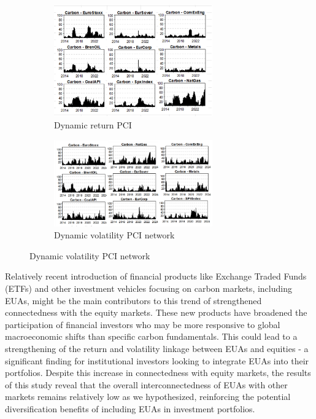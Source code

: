 \documentclass[preprint, 3p,
authoryear]{elsarticle} %
\begin{document}
\begin{figure}[H]
  \caption{Dynamic Return and Volatility Pairwise Connectedness Index (PCI) (Jan 2013 – Aug 2024)}
  \label{fig:dynPCI}
      \begin{subfigure}[b]{\textwidth}
        \centering
        \caption{Dynamic return PCI}
        \label{fig:dynretPCI}
        \includegraphics[width = 0.75\textwidth]{5a-DynRetPCI}
      \end{subfigure}
      \begin{subfigure}[b]{\textwidth}
        \centering
        \bigskip
        \caption{Dynamic volatility PCI network}
        \label{fig:dynvolPCI}
        \includegraphics[width = 0.75\textwidth]{5b-DynVolPCI}
      \end{subfigure}
\end{figure}

Relatively recent introduction of financial products like Exchange
Traded Funds (ETFs) and other investment vehicles focusing on carbon
markets, including EUAs, might be the main contributors to this trend of
strengthened connectedness with the equity markets. These new products
have broadened the participation of financial investors who may be more
responsive to global macroeconomic shifts than specific carbon
fundamentals. This could lead to a strengthening of the return and
volatility linkage between EUAs and equities - a significant finding for
institutional investors looking to integrate EUAs into their portfolios.
Despite this increase in connectedness with equity markets, the results
of this study reveal that the overall interconnectedness of EUAs with
other markets remains relatively low as we hypothesized, reinforcing the
potential diversification benefits of including EUAs in investment
portfolios.
\end{document}
